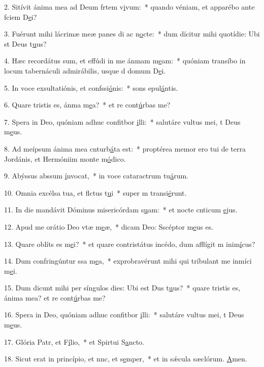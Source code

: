 2. Sitívit ánima mea ad Deum frtem v\uline{i}vum:~* quando véniam, et apparébo ante fciem D\uline{e}i?\par 
3. Fuérunt mihi lácrimæ meæ panes di ac n\uline{o}cte:~* dum dícitur mihi quotídie: Ubi st Deus t\uline{u}us?\par 
4. Hæc recordátus sum, et effúdi in me ánmam m\uline{e}am:~* quóniam transíbo in locum tabernáculi admirábilis, usque d domum D\uline{e}i.\par 
5. In voce exsultatiónis, et confssi\uline{ó}nis:~* sons epul\uline{á}ntis.\par 
6. Quare tristis es, ánma m\uline{e}a?~* et re cont\uline{ú}rbas me?\par 
7. Spera in Deo, quóniam adhuc confitbor \uline{i}lli:~* salutáre vultus mei, t Deus m\uline{e}us.\par 
8. Ad meípsum ánima mea cnturb\uline{á}ta est:~* proptérea memor ero tui de terra Jordánis, et Hermóniim  monte m\uline{ó}dico.\par 
9. Abýssus abssum \uline{í}nvocat,~* in voce cataractrum tu\uline{á}rum.\par 
10. Omnia excélsa tua, et flctus t\uline{u}i~* super m transi\uline{é}runt.\par 
11. In die mandávit Dóminus misericórdam s\uline{u}am:~* et nocte cnticum \uline{e}jus.\par 
12. Apud me orátio Deo vtæ m\uline{e}æ,~* dicam Deo: Sscéptor m\uline{e}us es.\par 
13. Quare oblíts es m\uline{e}i?~* et quare contristátus incédo, dum afflígit m inim\uline{í}cus?\par 
14. Dum confringúntur ssa m\uline{e}a,~* exprobravérunt mihi qui tríbulant me inmíci m\uline{e}i.\par 
15. Dum dicunt mihi per síngulos dies: Ubi est Dus t\uline{u}us?~* quare tristis es, ánima mea? et re cont\uline{ú}rbas me?\par 
16. Spera in Deo, quóniam adhuc confitbor \uline{i}lli:~* salutáre vultus mei, t Deus m\uline{e}us.\par 
17. Glória Patr, et F\uline{í}lio,~* et Spirtui S\uline{a}ncto.\par 
18. Sicut erat in princípio, et nnc, et s\uline{e}mper,~* et in sǽcula sæclórum. \uline{A}men.\par 
